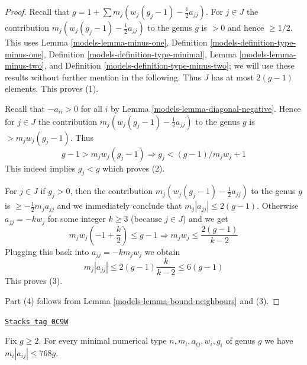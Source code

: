 \begin{proof}

Recall that $g = 1 + \sum m_j(w_j(g_j - 1) - \frac{1}{2} a_{jj})$.
For $j \in J$ the contribution $m_j(w_j(g_j - 1) - \frac{1}{2} a_{jj})$
to the genus $g$ is $> 0$ and hence $\geq 1/2$. This uses
Lemma \ref{models-lemma-minus-one},
Definition \ref{models-definition-type-minus-one},
Definition \ref{models-definition-type-minimal},
Lemma \ref{models-lemma-minus-two}, and
Definition \ref{models-definition-type-minus-two}; we will use these
results without further mention in the following.
Thus $J$ has at most $2(g - 1)$ elements.
This proves (1).

\medskip\noindent
Recall that $-a_{ii} > 0$ for all $i$ by Lemma \ref{models-lemma-diagonal-negative}.
Hence for $j \in J$ the contribution $m_j(w_j(g_j - 1) - \frac{1}{2} a_{jj})$
to the genus $g$ is $> m_jw_j(g_j - 1)$. Thus
$$
g - 1 > m_jw_j(g_j - 1) \Rightarrow g_j < (g - 1)/m_jw_j + 1
$$
This indeed implies $g_j < g$ which proves (2).

\medskip\noindent
For $j \in J$ if $g_j > 0$, then the contribution
$m_j(w_j(g_j - 1) - \frac{1}{2} a_{jj})$ to the genus $g$
is $\geq -\frac{1}{2}m_ja_{jj}$ and we immediately conclude
that $m_j|a_{jj}| \leq 2(g - 1)$. Otherwise $a_{jj} = -kw_j$
for some integer $k \geq 3$ (because $j \in J$) and we get
$$
m_jw_j(-1 + \frac{k}{2}) \leq g - 1
\Rightarrow
m_jw_j \leq \frac{2(g - 1)}{k - 2}
$$
Plugging this back into $a_{jj} = -km_jw_j$ we obtain
$$
m_j|a_{jj}| \leq 2(g - 1) \frac{k}{k - 2} \leq 6(g - 1)
$$
This proves (3).

\medskip\noindent
Part (4) follows from Lemma \ref{models-lemma-bound-neighbours} and (3).
\end{proof}

\begin{lemma}[Bound wm]
\label{models-lemma-bound-wm}
\href{https://stacks.math.columbia.edu/tag/0C9W}{\texttt{Stacks tag 0C9W}}

Fix $g \geq 2$. For every minimal numerical type $n, m_i, a_{ij}, w_i, g_i$
of genus $g$ we have $m_i|a_{ij}| \leq 768g$.
\end{lemma}

